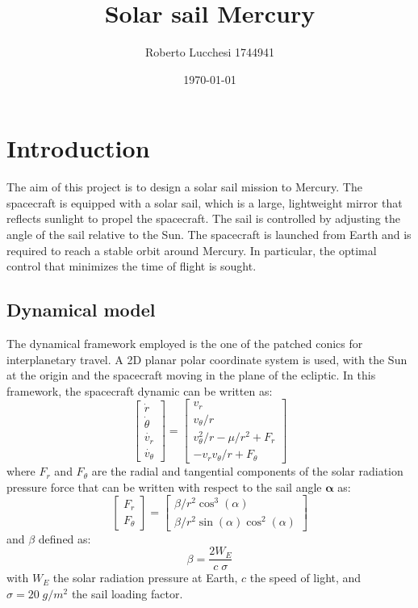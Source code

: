 \documentclass{report}
\title{#1}
\author{#2}
\date{#3}
\newcommand{\report}[3]{
    \title{#1}
    \author{#2}
    \date{#3}
    \maketitle
}
\begin{document}
\report{Solar sail Mercury}{Roberto Lucchesi 1744941}{\today}


\newpage

\section*{Introduction}
The aim of this project is to design a solar sail mission to Mercury. The spacecraft is equipped with a solar sail, which is a large, lightweight mirror that reflects sunlight to propel the spacecraft. The sail is controlled by adjusting the angle of the sail relative to the Sun. The spacecraft is launched from Earth and is required to reach a stable orbit around Mercury. 
In particular, the optimal control that minimizes the time of flight is sought. 

\subsection*{Dynamical model}
The dynamical framework employed is the one of the patched conics for interplanetary travel. 
A 2D planar polar coordinate system is used, with the Sun at the origin and the spacecraft moving in the plane of the ecliptic.
In this framework, the spacecraft dynamic can be written as:
\begin{equation*}
    \begin{bmatrix}
        \dot{r} \\
        \dot{\theta} \\
        \dot{v_r} \\
        \dot{v_{\theta}}
    \end{bmatrix}
    =
    \begin{bmatrix}
        v_r \\
        v_{\theta}/r \\
        v_{\theta}^2/r - \mu/r^2 + F_r \\
        -v_r v_{\theta}/r + F_{\theta}
    \end{bmatrix}
\end{equation*}
where $F_r$ and $F_{\theta}$ are the radial and tangential components of the solar radiation pressure force that can be
written with respect to the sail angle $\boldsymbol{\alpha}$ as:
\begin{equation*}
    \begin{bmatrix}
        F_r \\
        F_{\theta}
    \end{bmatrix}
    =
    \begin{bmatrix}
        \beta/r^2 \cos^3(\alpha) \\
        \beta/r^2 \sin(\alpha) \cos^2(\alpha)
    \end{bmatrix}
\end{equation*}
and $\beta$ defined as:
\begin{equation*}
    \beta = \frac{2 W_E}{c\; \sigma}
\end{equation*}
with $W_E$ the solar radiation pressure at Earth, $c$ the speed of light, and $\sigma = 20 \; g/m^2$ the sail loading factor.
\end{document}
